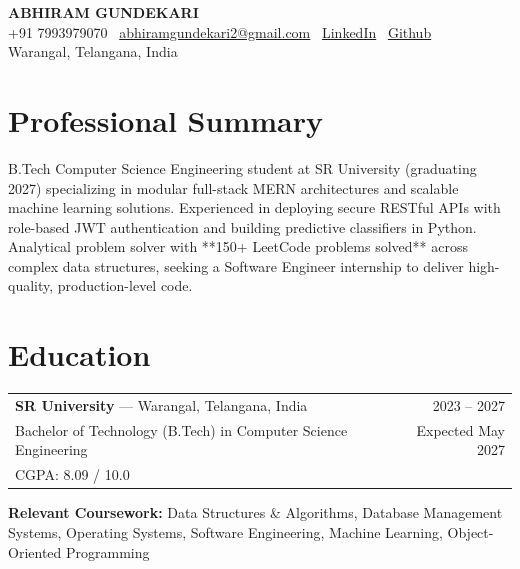 \documentclass[10pt, a4paper]{article}
\begin{document}
\pagestyle{empty}

\begin{center}
  {\LARGE \textbf{ABHIRAM GUNDEKARI}} \\[4pt]
  +91 7993979070 \textbar\
  \href{mailto:abhiramgundekari2@gmail.com}{abhiramgundekari2@gmail.com} \textbar\
  \href{https://www.linkedin.com/in/abhiram-gundekari-56a740295/}{LinkedIn} \textbar\
  \href{https://github.com/2303A51087}{Github} \\[2pt]
  Warangal, Telangana, India
\end{center}

\vspace{2pt}

\section*{Professional Summary}
\vspace{1pt}
B.Tech Computer Science Engineering student at SR University (graduating 2027) specializing in modular full-stack MERN architectures and scalable machine learning solutions. Experienced in deploying secure RESTful APIs with role-based JWT authentication and building predictive classifiers in Python. Analytical problem solver with **150+ LeetCode problems solved** across complex data structures, seeking a Software Engineer internship to deliver high-quality, production-level code.

\section*{Education}
\vspace{1pt}
\begin{tabularx}{\textwidth}{@{}X r@{}}
  \textbf{SR University} — Warangal, Telangana, India & 2023 – 2027 \\
  Bachelor of Technology (B.Tech) in Computer Science Engineering & Expected May 2027 \\
  CGPA: 8.09 / 10.0 & \\
\end{tabularx}

\vspace{2pt}
\textbf{Relevant Coursework:} Data Structures \& Algorithms, Database Management Systems,
Operating Systems, Software Engineering, Machine Learning, Object-Oriented Programming
\end{document}
